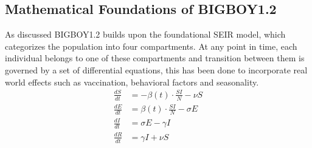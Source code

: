 \documentclass[11pt,a4paper]{article}
\theoremstyle{remark}\newtheorem{remark}{Remark}
\begin{document}
\subsection{Mathematical Foundations of BIGBOY1.2}
As discussed BIGBOY1.2 builds upon the foundational SEIR model, which categorizes the population into four compartments. At any point in time, each individual belongs to one of these compartments and transition between them is governed by a set of differential equations, this has been done to incorporate real world effects such as vaccination, behavioral factors and seasonality. \\
\begin{equation} \label{eq:SEIR Fundamental}
\begin{aligned}
    \frac{dS}{dt} &= -\beta(t) \cdot \frac{SI}{N} - \nu S \\
    \frac{dE}{dt} &= \beta(t) \cdot \frac{SI}{N} - \sigma E \\
    \frac{dI}{dt} &= \sigma E - \gamma I \\
    \frac{dR}{dt} &= \gamma I + \nu S
\end{aligned}
\end{equation}
\end{document}
